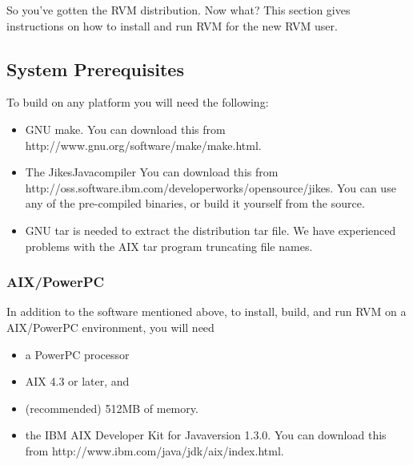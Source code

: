 So you've gotten the RVM distribution.  Now what?  This section gives
instructions on how to install and run RVM for the new RVM user.

\subsection{System Prerequisites}
To build on any platform you will need the following:
\begin{itemize}
\item GNU make. You can download this from
           {http://www.gnu.org/software/make/make.html}.

\item The Jikes\trademark Java\trademark compiler 
You can download this from
           {http://oss.software.ibm.com/developerworks/opensource/jikes}.
You can use any of the pre-compiled binaries, or build it yourself from the
source. 

\item GNU tar is needed to extract the distribution tar file.  We have
experienced problems with the AIX tar program truncating file names.

\end{itemize}

\subsubsection{AIX/PowerPC}
In addition to the software mentioned above, to install, build, and
run RVM on a AIX/PowerPC environment, 
you will need 
\begin{itemize}
\item a PowerPC processor
\item AIX 4.3 or later, and
\item (recommended) 512MB of memory.
\item the IBM AIX Developer Kit for Java\trademark version 1.3.0.  You can download this from
           {http://www.ibm.com/java/jdk/aix/index.html}.
\end{itemize}

